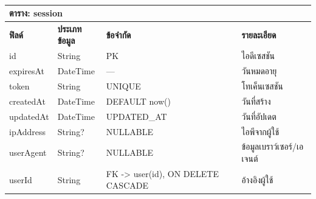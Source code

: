 \begin{table}[htbp]
    \caption{}\label{tab3:session_fields}
    \centering
    \renewcommand{\arraystretch}{1.2}
    \small
    \begin{tabular}{p{} p{} p{} p{}}
        \hline
        \multicolumn{4}{l}{\textbf{ตาราง: session}} \\
        \hline
            \textbf{ฟิลด์} & \textbf{ประเภทข้อมูล} & \textbf{ข้อจำกัด} & \textbf{รายละเอียด} \\
        \hline
        id & String & PK & ไอดีเซสชัน \\
        expiresAt & DateTime & — & วันหมดอายุ \\
        token & String & UNIQUE & โทเค็นเซสชัน \\
        createdAt & DateTime & DEFAULT now() & วันที่สร้าง \\
        updatedAt & DateTime & UPDATED\_AT & วันที่อัปเดต \\
        ipAddress & String? & NULLABLE & ไอพีจากผู้ใช้ \\
        userAgent & String? & NULLABLE & ข้อมูลเบราว์เซอร์/เอเจนต์ \\
        userId & String & FK -> user(id), ON DELETE CASCADE & อ้างอิงผู้ใช้ \\
        \hline
    \end{tabular}
\end{table}

